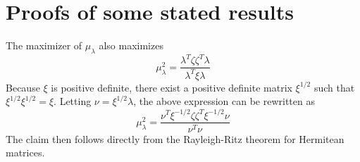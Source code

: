 \documentclass[final]{IEEEtran}
\theoremstyle{definition}
\begin{document}
\section{Proofs of some stated results}
\label{sec:proofs-some-stated}
\begin{IEEEproof}
  The maximizer of $\mu_\lambda$ also maximizes
  \begin{equation*}
    \mu_{\lambda}^{2} = \frac{\lambda^{T} \zeta \zeta^{T}
      \lambda}{\lambda^{T} \xi \lambda}
  \end{equation*}
  Because $\xi$ is positive definite, there exist a positive definite matrix
  $\xi^{1/2}$ such that $\xi^{1/2} \xi^{1/2} = \xi$. Letting $\nu = \xi^{1/2}
  \lambda$, the above expression can be rewritten as
  \begin{equation*}
    \mu_{\lambda}^{2} = \frac{\nu^{T} \xi^{-1/2} \zeta \zeta^{T}
      \xi^{-1/2} \nu}{ \nu^{T} \nu}
  \end{equation*}
  The claim then follows directly from the Rayleigh-Ritz theorem for
  Hermitean matrices.
\end{IEEEproof}
\end{document}
